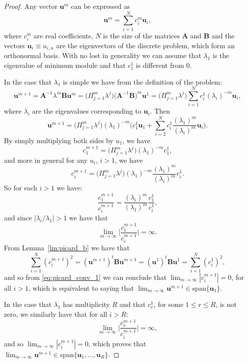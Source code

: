 \documentclass[preprint,12pt]{elsarticle}
\begin{document}
\begin{proof}
Any vector $\mathbf{u}^m$ can be expressed as 
$$
\mathbf{u}^m=\sum_{i=1}^N c_i^m \mathbf{u}_i,
$$
where $c_i^m$ are real coefficients, $N$ is the size of the matrices $\mathbf{A}$ and $\mathbf{B}$ and the vectors $\mathbf{u}_i\equiv u_{i,n}$ are the eigenvectors of the discrete problem, which form an orthonormal basis.
With no lost in generality we can assume that $\lambda_1$ is the eigenvalue of minimum module and that $c_1^1$ is different from 0.

In the case that $\lambda_1$ is simple we have from the definition of the problem:
$$
\mathbf{u}^{m+1}=\mathbf{A}^{-1}\lambda^m\mathbf{B}\mathbf{u}^{m}
=\Big(\Pi_{j=1}^m\lambda^{j}\Big)\Big(\mathbf{A}^{-1}\mathbf{B}\Big)^m\mathbf{u}^1
=\Big(\Pi_{j=1}^m\lambda^{j}\Big)\sum_{i=1}^N c_i^1 (\lambda_i)^{-m}\mathbf{u}_i,
$$
where $\lambda_i$ are the eigenvalues corresponding to $\mathbf{u}_i$.
Then
$$
\mathbf{u}^{m+1}=\Big(\Pi_{j=1}^m\lambda^{j}\Big)(\lambda_1)^{-m}\Big( c_1^1 \mathbf{u}_1 +
\sum_{i=2}^N c_i^1\frac{(\lambda_1)^m}{(\lambda_i)^{m}}\mathbf{u}_i\Big) .
$$
By simply multiplying both sides by $u_1$, we have
$$
c_1^{m+1}=\Big(\Pi_{j=1}^m\lambda^{j}\Big)(\lambda_1)^{-m}c_1^1,
$$
and more in general for any $u_i$, $i>1$, we have
$$
c_i^{m+1}=\Big(\Pi_{j=1}^m\lambda^{j}\Big)(\lambda_1)^{-m}\frac{(\lambda_1)^m}{(\lambda_i)^{m}}c_i^1.
$$
So for each $i>1$ we have:
$$
\frac{c_1^{m+1}}{c_i^{m+1}}=\frac{(\lambda_i)^m}{(\lambda_1)^{m}}\frac{c_1^1}{c_i^1},
$$
and since $|\lambda_i/\lambda_1|>1$ we have that
\begin{equation}\label{eq:picard_conv_1}
\lim_{m\rightarrow \infty}\Big\vert\frac{c_1^{m+1}}{c_i^{m+1}}\Big\vert= \infty.
\end{equation}
From Lemma~\ref{lm:picard_b} we have that
$$
\sum_{i=1}^N (c_i^{m+1})^2 = (\mathbf{u}^{m+1})^t\mathbf{B}\mathbf{u}^{m+1}
=(\mathbf{u}^1)^t\mathbf{B}\mathbf{u}^1=\sum_{i=1}^N (c_i^1)^2,
$$
and so from \eqref{eq:picard_conv_1} we can conclude that $\lim_{m\rightarrow \infty}|c_i^{m+1}|=0$, for all $i>1$, which is equivalent to saying that $\lim_{m\rightarrow \infty}\mathbf{u}^{m+1}\in \mathrm{span}\{\mathbf{u}_1\}$.

In the case that $\lambda_1$ has multiplicity $R$ and that $c_r^1$, for some $1\leq r\leq R$, is not zero,
we similarly have that for all $i>R$:
$$
\lim_{m\rightarrow \infty}\Big\vert\frac{c_r^{m+1}}{c_i^{m+1}}\Big\vert= \infty,
$$
and so $\lim_{m\rightarrow \infty}|c_i^{m+1}|=0$, which proves that $\lim_{m\rightarrow \infty}\mathbf{u}^{m+1}\in \mathrm{span}\{\mathbf{u}_1,\dots,\mathbf{u}_R\}$.

\end{proof}
\end{document}
